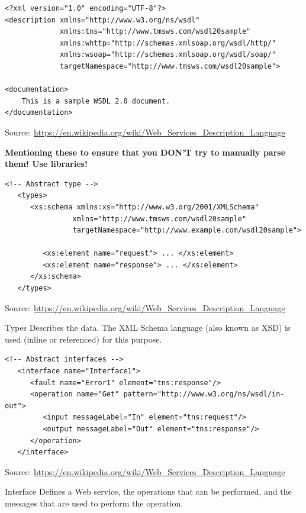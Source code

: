 \documentclass[Screen16to9,17pt]{foils}
\begin{document}

\begin{verbatim}
<?xml version="1.0" encoding="UTF-8"?>
<description xmlns="http://www.w3.org/ns/wsdl"
             xmlns:tns="http://www.tmsws.com/wsdl20sample"
             xmlns:whttp="http://schemas.xmlsoap.org/wsdl/http/"
             xmlns:wsoap="http://schemas.xmlsoap.org/wsdl/soap/"
             targetNamespace="http://www.tmsws.com/wsdl20sample">

<documentation>
    This is a sample WSDL 2.0 document.
</documentation>
\end{verbatim}
Source: \url{https://en.wikipedia.org/wiki/Web_Services_Description_Language}

\textbf{Mentioning these to ensure that you DON'T try to manually parse them! Use libraries!}


\begin{verbatim}
<!-- Abstract type -->
   <types>
      <xs:schema xmlns:xs="http://www.w3.org/2001/XMLSchema"
                xmlns="http://www.tmsws.com/wsdl20sample"
                targetNamespace="http://www.example.com/wsdl20sample">

         <xs:element name="request"> ... </xs:element>
         <xs:element name="response"> ... </xs:element>
      </xs:schema>
   </types>

\end{verbatim}
Source: \url{https://en.wikipedia.org/wiki/Web_Services_Description_Language}

Types	Describes the data. The XML Schema language (also known as XSD) is used (inline or referenced) for this purpose.



\begin{verbatim}
<!-- Abstract interfaces -->
   <interface name="Interface1">
      <fault name="Error1" element="tns:response"/>
      <operation name="Get" pattern="http://www.w3.org/ns/wsdl/in-out">
         <input messageLabel="In" element="tns:request"/>
         <output messageLabel="Out" element="tns:response"/>
      </operation>
   </interface>
\end{verbatim}
Source: \url{https://en.wikipedia.org/wiki/Web_Services_Description_Language}

Interface	Defines a Web service, the operations that can be performed, and the messages that are used to perform the operation.
\end{document}
